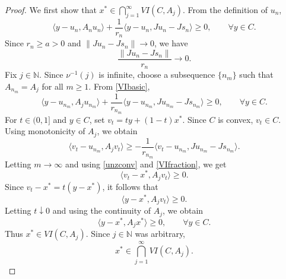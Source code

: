 \documentclass[leqno,12pt]{amsart}
\theoremstyle{definition}
\numberwithin{equation}{section}
\begin{document}
\begin{proof}
We first show that $x^{*}\in \bigcap_{j=1}^{\infty}VI(C,A_j)$. From the definition of $u_n$,
\begin{equation}\label{VIbasic}
\langle y-u_n,A_nu_n\rangle+\frac{1}{r_n}\langle y-u_n,Ju_n-Js_n\rangle\geq 0,
\qquad \forall y\in C.
\end{equation}
Since $r_n\geq a>0$ and $\|Ju_n-Js_n\|\to 0$, we have
\begin{equation}\label{VIfraction}
\frac{\|Ju_n-Js_n\|}{r_n}\to 0.
\end{equation}
Fix $j\in\mathbb{N}$. Since $\nu^{-1}(j)$ is infinite, choose a subsequence $\{n_m\}$ such that $A_{n_m}=A_j$ for all $m\geq 1$. From \eqref{VIbasic},
\[
\langle y-u_{n_m},A_ju_{n_m}\rangle+\frac{1}{r_{n_m}}\langle y-u_{n_m},Ju_{n_m}-Js_{n_m}\rangle\geq 0,
\qquad \forall y\in C.
\]
For $t\in(0,1]$ and $y\in C$, set $v_t=ty+(1-t)x^{*}$. Since $C$ is convex, $v_t\in C$. Using monotonicity of $A_j$, we obtain
\[
\langle v_t-u_{n_m},A_jv_t\rangle\geq -\frac{1}{r_{n_m}}\langle v_t-u_{n_m},Ju_{n_m}-Js_{n_m}\rangle.
\]
Letting $m\to\infty$ and using \eqref{unzconv} and \eqref{VIfraction}, we get
\[
\langle v_t-x^{*},A_jv_t\rangle\geq 0.
\]
Since $v_t-x^{*}=t(y-x^{*})$, it follows that
\[
\langle y-x^{*},A_jv_t\rangle\geq 0.
\]
Letting $t\downarrow 0$ and using the continuity of $A_j$, we obtain
\[
\langle y-x^{*},A_jx^{*}\rangle\geq 0,
\qquad \forall y\in C.
\]
Thus $x^{*}\in VI(C,A_j)$. Since $j\in\mathbb{N}$ was arbitrary,
\begin{equation}\label{VIall}
x^{*}\in \bigcap_{j=1}^{\infty}VI(C,A_j).
\end{equation}


\end{proof}
\end{document}

